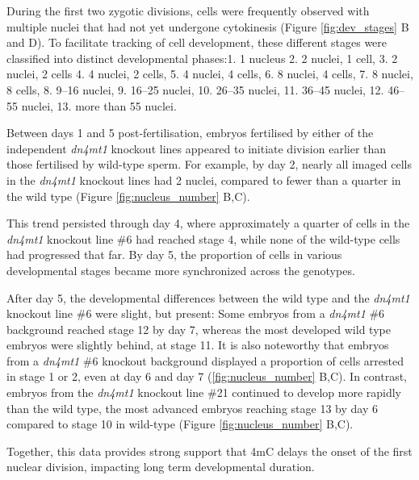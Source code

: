During the first two zygotic divisions, cells were frequently observed with multiple nuclei that had not yet undergone cytokinesis (Figure \ref{fig:dev_stages} B and D).  To facilitate tracking of cell development, these different stages were classified into distinct developmental phases:1. 1 nucleus 2. 2 nuclei, 1 cell, 3. 2 nuclei, 2 cells 4. 4 nuclei, 2 cells, 5. 4 nuclei, 4 cells, 6. 8 nuclei, 4 cells, 7. 8 nuclei, 8 cells, 8. 9–16 nuclei, 9. 16–25 nuclei, 10. 26–35 nuclei, 11. 36–45 nuclei, 12. 46–55 nuclei, 13. more than 55 nuclei.

Between days 1 and 5 post-fertilisation, embryos fertilised by either of the independent \textit{dn4mt1} knockout lines appeared to initiate division earlier than those fertilised by wild-type sperm. For example, by day 2, nearly all imaged cells in the \textit{dn4mt1} knockout lines had 2 nuclei, compared to fewer than a quarter in the wild type (Figure \ref{fig:nucleus_number} B,C).  

This trend persisted through day 4, where approximately a quarter of cells in the \textit{dn4mt1} knockout line \#6 had reached stage 4, while none of the wild-type cells had progressed that far. By day 5, the proportion of cells in various developmental stages became more synchronized across the genotypes. 

After day 5, the developmental differences between the wild type and the \textit{dn4mt1} knockout line \#6 were slight, but present: Some embryos from a \textit{dn4mt1} \#6 background reached stage 12 by day 7, whereas the most developed wild type embryos were slightly behind, at stage 11. It is also noteworthy that embryos from a  \textit{dn4mt1} \#6 knockout background displayed a proportion of cells arrested in stage 1 or 2, even at day 6 and day 7 (\ref{fig:nucleus_number} B,C). In contrast, embryos from the \textit{dn4mt1} knockout line \#21 continued to develop more rapidly than the wild type, the most advanced embryos reaching stage 13 by day 6 compared to stage 10 in wild-type (Figure \ref{fig:nucleus_number} B,C). 

Together, this data provides strong support that 4mC delays the onset of the first nuclear division, impacting long term developmental duration.


